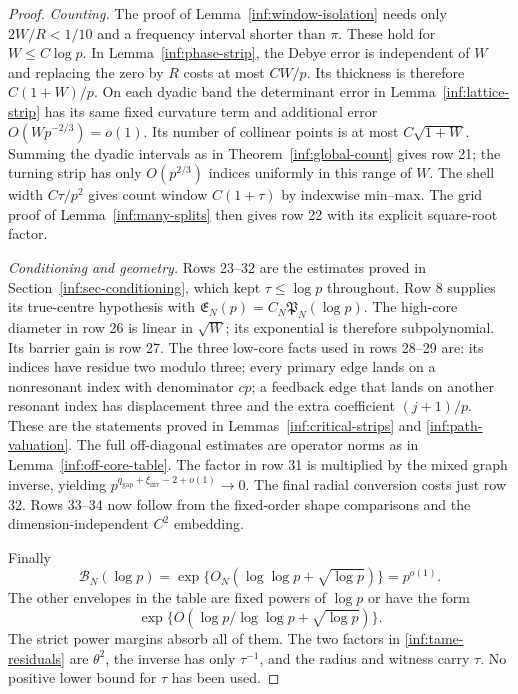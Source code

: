 \begin{proof}
\emph{Counting.}
The proof of Lemma~\ref{inf:window-isolation} needs only
$2W/R<1/10$ and a frequency interval shorter than $\pi$.
These hold for $W\le C\log p$.
In Lemma~\ref{inf:phase-strip}, the Debye error is independent of
$W$ and replacing the zero by $R$ costs at most $C W/p$.
Its thickness is therefore $C(1+W)/p$.
On each dyadic band the determinant error in
Lemma~\ref{inf:lattice-strip} has its same fixed curvature term
and additional error $O(Wp^{-2/3})=o(1)$.
Its number of collinear points is at most $C\sqrt{1+W}$.
Summing the dyadic intervals as in Theorem~\ref{inf:global-count}
gives row 21; the turning strip has only $O(p^{2/3})$ indices
uniformly in this range of $W$.
The shell width $C\tau/p^2$ gives count window $C(1+\tau)$ by
indexwise min--max. The grid proof of Lemma~\ref{inf:many-splits}
then gives row 22 with its explicit square-root factor.

\emph{Conditioning and geometry.}
Rows 23--32 are the estimates proved in
Section~\ref{inf:sec-conditioning}, which kept $\tau\le\log p$
throughout. Row 8 supplies its true-centre hypothesis with
$\mathfrak E_N(p)=C_N\mathfrak P_N(\log p)$.
The high-core diameter in row 26 is linear in $\sqrt W$;
its exponential is therefore subpolynomial. Its barrier gain is
row 27. The three low-core facts used in rows 28--29 are: its
indices have residue two modulo three; every primary edge lands
on a nonresonant index with denominator $cp$; a feedback edge
that lands on another resonant index has displacement three and
the extra coefficient $(j+1)/p$. These are the statements proved
in Lemmas~\ref{inf:critical-strips} and \ref{inf:path-valuation}.
The full off-diagonal estimates are operator norms as in
Lemma~\ref{inf:off-core-table}. The factor in row 31 is multiplied
by the mixed graph inverse, yielding
$p^{q_{\mathrm{gap}}+\xi_{\mathrm{inv}}-2+o(1)}\to0$.
The final radial conversion costs just row 32.
Rows 33--34 now follow from the fixed-order shape comparisons and
the dimension-independent $C^2$ embedding.

Finally
\[
 \mathcal B_N(\log p)
 =\exp\{O_N(\log\log p+\sqrt{\log p})\}=p^{o(1)}.
\]
The other envelopes in the table are fixed powers of $\log p$ or
have the form
\[
 \exp\{O(\log p/\log\log p+\sqrt{\log p})\}.
\]
The strict power margins absorb all of them. The two factors in
\eqref{inf:tame-residuals} are $\theta^2$, the inverse has only
$\tau^{-1}$, and the radius and witness carry $\tau$.
No positive lower bound for $\tau$ has been used.
\end{proof}

